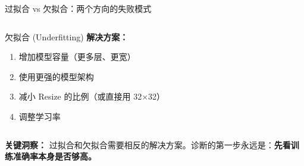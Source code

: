 \documentclass[aspectratio=169]{ctexbeamer}
\begin{document}
\begin{frame}[shrink=20]{过拟合 vs 欠拟合：两个方向的失败模式}
\begin{columns}[T]
\begin{block}{欠拟合 (Underfitting)}
\textbf{解决方案：}
\begin{enumerate}
  \item 增加模型容量（更多层、更宽）
  \item 使用更强的模型架构
  \item 减小 Resize 的比例（或直接用 32$\times$32）
  \item 调整学习率
\end{enumerate}
\end{block}
\end{columns}

\vspace{0.1cm}
\footnotesize
\begin{center}
\textbf{关键洞察：} 过拟合和欠拟合需要相反的解决方案。诊断的第一步永远是：\textbf{先看训练准确率本身是否够高。}
\end{center}
\end{frame}
\end{document}

